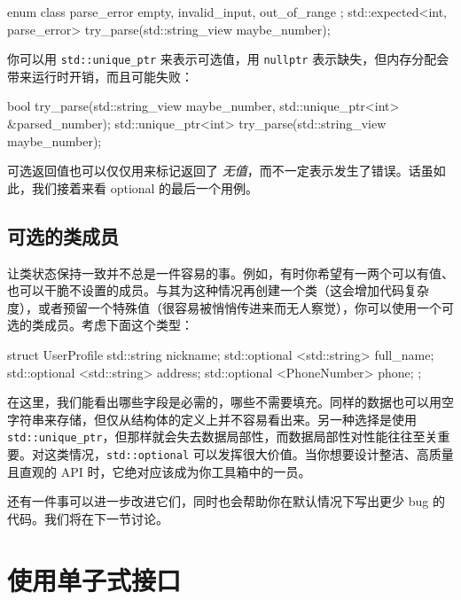 \begin{codebox}[cpp]
enum class parse_error
{
    empty,
    invalid_input,
    out_of_range
};
std::expected<int, parse_error> try_parse(std::string_view maybe_number);
\end{codebox}

你可以用 \texttt{std::\allowbreak{}unique\_\allowbreak{}ptr} 来表示可选值，用 \texttt{nullptr} 表示缺失，但内存分配会带来运行时开销，而且可能失败：

\begin{codebox}[cpp]
bool try_parse(std::string_view maybe_number, std::unique_ptr<int> &parsed_number);
std::unique_ptr<int> try_parse(std::string_view maybe_number);
\end{codebox}

可选返回值也可以仅仅用来标记返回了 \emph{无值}，而不一定表示发生了错误。话虽如此，我们接着来看 optional 的最后一个用例。

\subsection{可选的类成员}

\label{idx:471}
让类状态保持一致并不总是一件容易的事。例如，有时你希望有一两个可以有值、也可以干脆不设置的成员。与其为这种情况再创建一个类（这会增加代码复杂度），或者预留一个特殊值（很容易被悄悄传进来而无人察觉），你可以使用一个可选的类成员。考虑下面这个类型：

\begin{codebox}[cpp]
struct UserProfile {
    std::string nickname;
    std::optional <std::string> full_name;
    std::optional <std::string> address;
    std::optional <PhoneNumber> phone;
};
\end{codebox}

\label{idx:472}
在这里，我们能看出哪些字段是必需的，哪些不需要填充。同样的数据也可以用空字符串来存储，但仅从结构体的定义上并不容易看出来。另一种选择是使用 \texttt{std::\allowbreak{}unique\_\allowbreak{}ptr}，但那样就会失去数据局部性，而数据局部性对性能往往至关重要。对这类情况，\texttt{std::\allowbreak{}optional} 可以发挥很大价值。当你想要设计整洁、高质量且直观的 API 时，它绝对应该成为你工具箱中的一员。

还有一件事可以进一步改进它们，同时也会帮助你在默认情况下写出更少 bug 的代码。我们将在下一节讨论。

\section{使用单子式接口}

